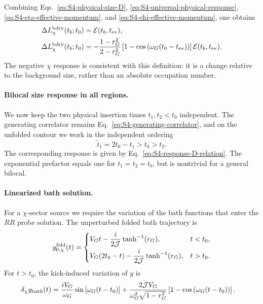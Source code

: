 \documentclass[11pt,a4paper]{article}
\begin{document}
Combining Eqs.~\eqref{eq:S4-physical-size-D},
\eqref{eq:S4-universal-physical-response},
\eqref{eq:S4-eta-effective-momentum}, and
\eqref{eq:S4-chi-effective-momentum}, one obtains
\begin{equation}
\begin{aligned}
  \Delta L^{\rm bdry}_\eta(t_b;t_0)
  &=
  \mathcal E(t_b,t_{\rm ev}),
  \\
  \Delta L^{\rm bdry}_\chi(t_b;t_0)
  &=
  -\frac{1-r_G^2}{2-r_G^2}
  \left[
  1-
  \cos\left(
  \omega_G(t_0-t_{\rm ev})
  \right)
  \right]
  \mathcal E(t_b,t_{\rm ev}).
\end{aligned}
\label{eq:S4-boundary-size-results}
\end{equation}
The negative \(\chi\) response is consistent with this definition: it is a change relative to the background size, rather than an absolute occupation number.

\paragraph*{Bilocal size response in all regions.}

We now keep the two physical insertion times \(t_1,t_2<t_0\) independent.
The generating correlator remains Eq.~\eqref{eq:S4-generating-correlator},
and on the unfolded contour we work in the independent ordering
\begin{equation}
  \widetilde t_1=2t_0-t_1>t_0>t_2.
\label{eq:S4-bilocal-domain}
\end{equation}
The corresponding response is given by
Eq.~\eqref{eq:S4-response-D-relation}. The exponential prefactor equals one
for \(t_1=t_2=t_b\), but is nontrivial for a general bilocal.

\paragraph*{Linearized bath solution.}

For a \(\chi\)-sector source we require the variation of the bath functions
that enter the \(RR\) probe solution. The unperturbed folded bath trajectory
is
\begin{equation}
  y^{\rm fold}_{0,\chi}(t)
  =
  \begin{cases}
  \displaystyle
  V_Gt
  -
  \frac{i}{2\mathcal J}\tanh^{-1}(r_G),
  &
  t<t_0,
  \\[6pt]
  \displaystyle
  V_G(2t_0-t)
  -
  \frac{i}{2\mathcal J}\tanh^{-1}(r_G),
  &
  t>t_0.
  \end{cases}
\label{eq:S4-folded-bath-trajectory}
\end{equation}
For \(t>t_0\), the kick-induced variation of \(y\) is
\begin{equation}
\begin{aligned}
  \delta_\chi y_{\rm bath}(t)
  &=
  \frac{iV_G}{\omega_G}
  \sin\left[
  \omega_G(t-t_0)
  \right]+
  \frac{
  2\mathcal J V_G
  }{
  \omega_G^2\sqrt{1-r_G^2}
  }
  \left[
  1-
  \cos\left(
  \omega_G(t-t_0)
  \right)
  \right].
\end{aligned}
\label{eq:S4-folded-bath-variation}
\end{equation}
\end{document}
